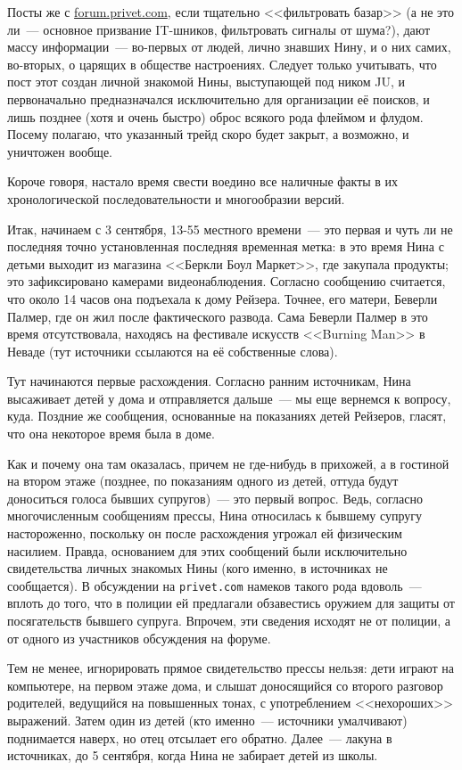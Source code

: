 Посты же с \href{http://forum.privet.com}{forum.privet.com}, если тщательно <<фильтровать базар>> (а не это ли~--- основное призвание IT-шников, фильтровать сигналы от шума?), дают массу информации~--- во-первых от людей, лично знавших Нину, и о них самих, во-вторых, о царящих в обществе настроениях. Следует только учитывать, что пост этот создан личной знакомой Нины, выступающей под ником JU, и первоначально предназначался исключительно для организации её поисков, и лишь позднее (хотя и очень быстро) оброс всякого рода флеймом и флудом. Посему полагаю, что указанный трейд скоро будет закрыт, а возможно, и уничтожен вообще. 

Короче говоря, настало время свести воедино все наличные факты в их хронологической последовательности и многообразии версий. 

Итак, начинаем с 3 сентября, 13-55 местного времени~--- это первая и чуть ли не последняя точно установленная последняя временная метка: в это время Нина с детьми выходит из магазина <<Беркли Боул Маркет>>, где закупала продукты; это зафиксировано камерами видеонаблюдения. Согласно сообщению считается, что около 14 часов она подъехала к дому Рейзера. Точнее, его матери, Беверли Палмер, где он жил после фактического развода. Сама Беверли Палмер в это время отсутствовала, находясь на фестивале искусств <<Burning Man>> в Неваде (тут источники ссылаются на её собственные слова). 

Тут начинаются первые расхождения. Согласно ранним источникам, Нина высаживает детей у дома и отправляется дальше~--- мы еще вернемся к вопросу, куда. Поздние же сообщения, основанные на показаниях детей Рейзеров, гласят, что она некоторое время была в доме. 

Как и почему она там оказалась, причем не где-нибудь в прихожей, а в гостиной на втором этаже (позднее, по показаниям одного из детей, оттуда будут доноситься голоса бывших супругов)~--- это первый вопрос. Ведь, согласно многочисленным сообщениям прессы, Нина относилась к бывшему супругу настороженно, поскольку он после расхождения угрожал ей физическим насилием. Правда, основанием для этих сообщений были исключительно свидетельства личных знакомых Нины (кого именно, в источниках не сообщается). В обсуждении на \texttt{privet.com} намеков такого рода вдоволь~--- вплоть до того, что в полиции ей предлагали обзавестись оружием для защиты от посягательств бывшего супруга. Впрочем, эти сведения исходят не от полиции, а от одного из участников обсуждения на форуме. 

Тем не менее, игнорировать прямое свидетельство прессы нельзя: дети играют на компьютере, на первом этаже дома, и слышат доносящийся со второго разговор родителей, ведущийся на повышенных тонах, с употреблением <<нехороших>> выражений. Затем один из детей (кто именно~--- источники умалчивают) поднимается наверх, но отец отсылает его обратно. Далее~--- лакуна в источниках, до 5 сентября, когда Нина не забирает детей из школы. 

